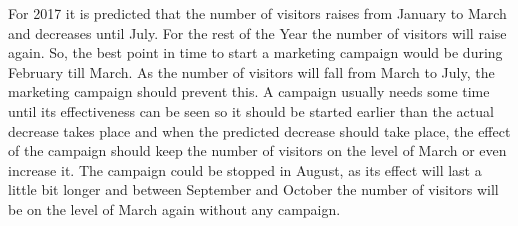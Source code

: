 For 2017 it is predicted that the number of visitors raises from January to March and decreases until July. For the rest of the Year the number of visitors will raise again. So, the best point in time to start a marketing campaign would be during February till March. As the number of visitors will fall from March to July, the marketing campaign should prevent this. A campaign usually needs some time until its effectiveness can be seen so it should be started earlier than the actual decrease takes place and when the predicted decrease should take place, the effect of the campaign should keep the number of visitors on the level of March or even increase it. The campaign could be stopped in August, as its effect will last a little bit longer and between September and October the number of visitors will be on the level of March again without any campaign.


%
